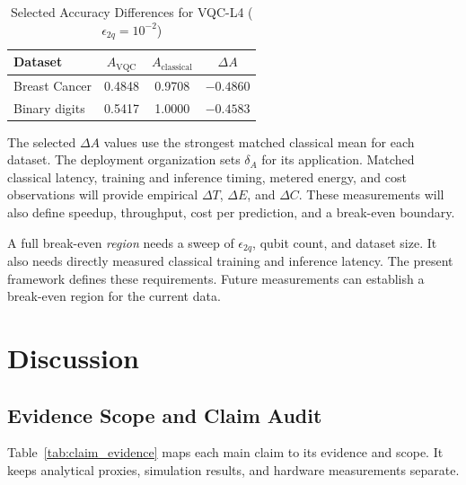 \documentclass[final,5p,times,number]{elsarticle}
\begin{document}
\begin{table}[!htbp]
  \centering
  \caption{Selected Accuracy Differences for VQC-L4 ($\epsilon_{2q}=10^{-2}$)}
  \label{tab:breakeven}
  \small
  \setlength{\tabcolsep}{4pt}
  \begin{tabular}{lccc}
    \toprule
    \textbf{Dataset} & \textbf{$A_{\text{VQC}}$} & \textbf{$A_{\text{classical}}$} & \textbf{$\Delta A$} \\
    \midrule
    Breast Cancer  & 0.4848 & 0.9708 & $-0.4860$ \\
    Binary digits  & 0.5417 & 1.0000 & $-0.4583$ \\
    \bottomrule
  \end{tabular}
\end{table}

The selected $\Delta A$ values use the strongest matched classical mean for each dataset. The deployment organization sets $\delta_A$ for its application. Matched classical latency, training and inference timing, metered energy, and cost observations will provide empirical $\Delta T$, $\Delta E$, and $\Delta C$. These measurements will also define speedup, throughput, cost per prediction, and a break-even boundary.

A full break-even \emph{region} needs a sweep of $\epsilon_{2q}$, qubit count, and dataset size. It also needs directly measured classical training and inference latency. The present framework defines these requirements. Future measurements can establish a break-even region for the current data.

\section{Discussion}
\label{sec:discussion}

\subsection{Evidence Scope and Claim Audit}

Table~\ref{tab:claim_evidence} maps each main claim to its evidence and scope. It keeps analytical proxies, simulation results, and hardware measurements separate.
\end{document}
